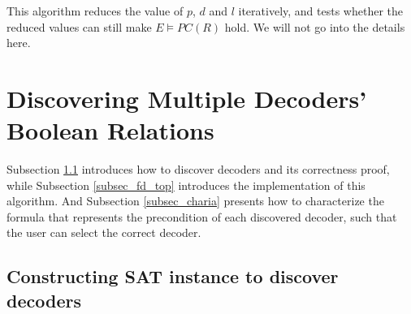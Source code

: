 \documentclass[journal]{IEEEtran}
\begin{document}
This algorithm reduces the value of $p$, $d$ and $l$ iteratively,
and tests whether the reduced values can still make $E\vDash PC(R)$ hold.
We will not go into the details here.



\section{Discovering Multiple Decoders' Boolean Relations}\label{sec_fdtest}
Subsection \ref{subsec_fd_detail} introduces how to discover decoders and its correctness proof,
while Subsection \ref{subsec_fd_top} introduces the implementation of this algorithm.
And Subsection \ref{subsec_charia} presents how to characterize the formula that represents the precondition of each discovered decoder,
such that the user can select the correct decoder.

\subsection{Constructing SAT instance to discover decoders}\label{subsec_fd_detail}
%


%
\end{document}
